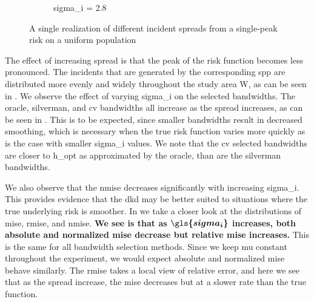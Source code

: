 \begin{figure}[htbp]
\begin{subfigure}{0.45\textwidth}
        \caption{\gls{sigma_i} = 2.8}
    \end{subfigure}
    \caption[Examples showing incident spread]
        {A single realization of different incident \glspl{spread} from a single-peak risk on a uniform population}
    \label{fig:one_sample:unif_Spreads_1h}
\end{figure}

The effect of increasing \gls{spread} is that the peak of the risk function becomes less pronounced.
The incidents that are generated by the corresponding \gls{spp} are distributed more evenly and widely throughout the study area \gls{W},
as can be seen in .
We observe the effect of varying \gls{sigma_i} on the selected bandwidths.
The \gls{oracle}, \gls{silverman}, and \gls{cv} bandwidths all increase as the spread increases, as can be seen in .
This is to be expected, since smaller bandwidths result in decreased smoothing,
which is necessary when the true risk function varies more quickly as is the case with smaller \gls{sigma_i} values.
We note that the \gls{cv} selected bandwidths are closer to \gls{h_opt} as approximated by the \gls{oracle}, than are the \gls{silverman} bandwidths.



We also observe that the \gls{nmise} decreases significantly with increasing \gls{sigma_i}.
This provides evidence that the \gls{dkd} may be better suited to situations where the true underlying risk is smoother.
In  we take a closer look at the distributions of \gls{mise}, \gls{rmise}, and \gls{nmise}.
\textbf{We see is that as $\boldsymbol{\gls{sigma_i}}$ increases, both absolute and normalized \gls{mise} decrease but relative \gls{mise} increases.}
This is the same for all bandwidth selection methods.
Since we keep \gls{mu} constant throughout the experiment, we would expect absolute and normalized \gls{mise} behave similarly.
The \gls{rmise} takes a local view of relative error, and here we see that as the \gls{spread} increase, the \gls{mise} decreases but at a slower rate than the true function.


